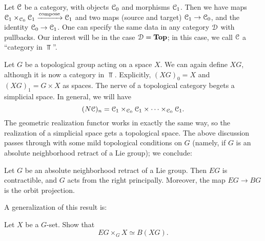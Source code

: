Let $\mathcal C$ be a category, with objects $\mathcal C_0$ and morphisms $\mathcal C_1$. Then we
have maps $\mathcal C_1\times_{\mathcal C_0}\mathcal C_1\xrightarrow{\text{compose}}\mathcal C_1$ and two
maps (source and target) $\mathcal C_1\to \mathcal C_0$, and the identity $\mathcal C_0\to\mathcal C_1$.
One can specify the same data in any category $\mathcal D$ with pullbacks. Our
interest will be in the case $\mathcal D = \mathbf{Top}$; in this case, we call $\mathcal C$ a
``category in $\Top$''.

%
Let $G$ be a topological group acting on a space $X$. We can again define $XG$,
although it is now a category in $\Top$. Explicitly, $(XG)_0 = X$ and $(XG)_1 =
G\times X$ as spaces. The nerve of a topological category begets a simplicial
space. In general, we will have
$$(N\mathcal C)_n = \mathcal C_1\times_{\mathcal C_0}\mathcal C_1\times\cdots\times_{\mathcal C_0}\mathcal C_1.$$
The geometric realization functor works in exactly the same way, so the
realization of a simplicial space gets a topological space.
%
The above discussion passes through with some mild topological conditions on
$G$ (namely, if $G$ is an absolute neighborhood retract of a Lie group); we
conclude:
\begin{theorem}
    Let $G$ be an absolute neighborhood retract of a Lie group. Then $EG$ is
    contractible, and $G$ acts from the right principally. Moreover, the map
    $EG\to BG$ is the orbit projection.
\end{theorem}
A generalization of this result is:
\begin{exercise}
    Let $X$ be a $G$-set. Show that
    $$EG\times_G X \simeq B(XG).$$
\end{exercise}
